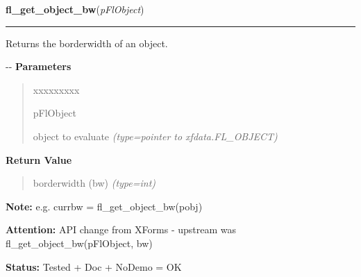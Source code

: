 \hspace{.8\funcindent}\begin{boxedminipage}{\funcwidth}

    \raggedright \textbf{fl\_get\_object\_bw}(\textit{pFlObject})

    \vspace{-1.5ex}

    \rule{\textwidth}{0.5\fboxrule}
\setlength{\parskip}{2ex}

Returns the borderwidth of an object.

-{}-
\setlength{\parskip}{1ex}
      \textbf{Parameters}
      \vspace{-1ex}

      \begin{quote}
        \begin{Ventry}{xxxxxxxxx}

          \item[pFlObject]


object to evaluate
            {\it (type=pointer to xfdata.FL\_OBJECT)}

        \end{Ventry}

      \end{quote}

      \textbf{Return Value}
    \vspace{-1ex}

      \begin{quote}

borderwidth (bw)
      {\it (type=int)}

      \end{quote}

\textbf{Note:} 
e.g. currbw = fl\_get\_object\_bw(pobj)


\textbf{Attention:} 
API change from XForms - upstream was
fl\_get\_object\_bw(pFlObject, bw)


\textbf{Status:} 
Tested + Doc + NoDemo = OK


    \end{boxedminipage}

    \label{xformslib:flbasic:fl_set_object_resize}

    \vspace{0.5ex}

